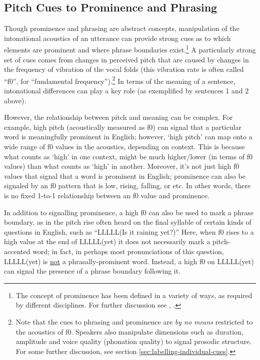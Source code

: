 \documentclass[11pt, twoside]{memoir}
\begin{document}
\subsection{Pitch Cues to Prominence and Phrasing}\label{sec:pitch-cues-to-prominence-and-phrasing}

Though prominence and phrasing are abstract concepts, manipulation of the intonational acoustics of an utterance can provide strong cues as to which elements are prominent and where phrase boundaries exist.\footnote{The concept of prominence has been defined in a variety of ways, as required by different disciplines. For further discussion see \citealt{gussenhoven15}, \citealt{wagner-15}.} A particularly strong set of cues comes from changes in perceived pitch that are caused by changes in the frequency of vibration of the vocal folds (this vibration rate is often called “f0”, for “fundamental frequency”).\footnote{Note that the cues to phrasing and prominence are \textit{by no means} restricted to the acoustics of f0.  Speakers also manipulate dimensions such as duration, amplitude and voice quality (phonation quality) to signal prosodic structure. For some further discussion, see section \ref{sec:labelling-individual-cues}.} In terms of the meaning of a sentence, intonational differences can play a key role (as exemplified by sentences 1 and 2 above).

However, the relationship between pitch and meaning can be complex. For example, high pitch (acoustically measured as f0) can signal that a particular word is meaningfully prominent in English; however, ‘high pitch’ can map onto a wide range of f0 values in the acoustics, depending on context. This is because what counts as ‘high’ in one context, might be much higher\slash lower (in terms of f0 values) than what counts as ‘high’ in another. Moreover, it’s not just high f0 values that signal that a word is prominent in English; prominence can also be signaled by an f0 pattern that is low, rising, falling, or etc. In other words, there is no fixed 1-to-1 relationship between an f0 value and prominence.

In addition to signalling prominence, a high f0 can also be used to mark a phrase boundary, as in the pitch rise often heard on the final syllable of certain kinds of questions in English, such as “LLLLL(Is it raining yet?)” Here, when f0 rises to a high value at the end of LLLLL(yet) it does not necessarily mark a pitch-accented word; in fact, in perhaps most pronunciations of this question, LLLLL(yet) is \uline{not} a phrasally-prominent word. Instead, a high f0 on LLLLL(yet) can signal the presence of a phrase boundary following it.
\end{document}
